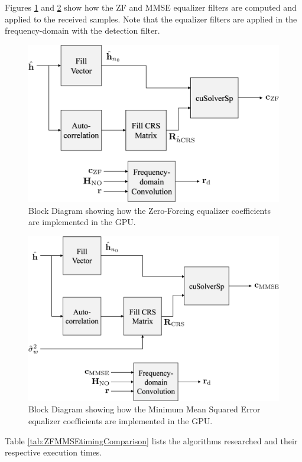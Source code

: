 Figures \ref{fig:blockZF} and \ref{fig:blockMMSE} show how the ZF and MMSE equalizer filters are computed and applied to the received samples.
Note that the equalizer filters are applied in the frequency-domain with the detection filter.
\begin{figure}
	\centering\includegraphics[width=7.5in/100*55]{figures/eq_GPUimplementation/blockZF.pdf}
	\caption{Block Diagram showing how the Zero-Forcing equalizer coefficients are implemented in the GPU.}
	\label{fig:blockZF}
\end{figure}
\begin{figure}
	\centering\includegraphics[width=7.98in/100*55]{figures/eq_GPUimplementation/blockMMSE.pdf}
	\caption{Block Diagram showing how the Minimum Mean Squared Error equalizer coefficients are implemented in the GPU.}
	\label{fig:blockMMSE}
\end{figure}
Table \ref{tab:ZFMMSEtimingComparison} lists the algorithms researched and their respective execution times.
